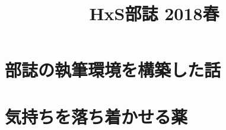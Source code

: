 \documentclass[10.5pt,a4paper]{jsbook}
\title{HxS部誌 2018春}
\date{}
\begin{document}
\maketitle
\tableofcontents

\chapter{部誌の執筆環境を構築した話}


\chapter{気持ちを落ち着かせる薬}

\end{document}
